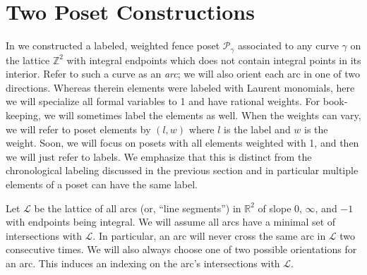 \documentclass[12pt, letterpaper,table]{amsart}
\theoremstyle{remark}
\newcommand{\calP}{\mathcal{P}}
\begin{document}
\section{Two Poset Constructions}\label{sec:TwoPosets}

In \cite{BG} we constructed a labeled, weighted fence poset $\calP_\gamma$ associated to any curve $\gamma$ on the lattice $\mathbb{Z}^2$ with integral endpoints which does not contain integral points in its interior. Refer to such a curve as an \emph{arc}; we will also orient each arc in one of two directions. Whereas therein elements were labeled with Laurent monomials, here we will specialize all formal variables to 1 and have rational weights. For book-keeping, we will sometimes label the elements as well. When the weights can vary, we will refer to poset elements  by $(l,w)$ where $l$ is the label and $w$ is the weight. Soon, we will focus on posets with all elements weighted with 1, and then we will just refer to labels. We emphasize that this is distinct from the chronological labeling discussed in the previous section and in particular multiple elements of a poset can have the same label.

Let $\mathcal{L}$ be the lattice of all arcs (or, ``line segments'') in $\mathbb{R}^2$ of slope 0, $\infty$, and $-1$ with endpoints being integral.  
 We will assume all arcs have a minimal set of intersections with $\mathcal{L}$. In particular, an arc will never cross the same arc  in $\mathcal{L}$ two consecutive times. We will also always choose one of two possible orientations for an arc. This induces an indexing on the arc's intersections with $\mathcal{L}$.
\end{document}
